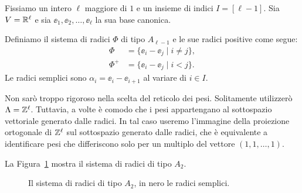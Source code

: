 \begin{example}
    \label{ex:sist_rad_A}
    Fissiamo un intero $\ell$ maggiore di $1$ e un insieme di indici $I = [\ell-1]$.
    Sia $V = \mathbb{R}^\ell$ e sia $\ee_1, \ee_2, \dots, \ee_\ell$ la sua base canonica.

    Definiamo il sistema di radici $\Phi$ di tipo $A_{\ell-1}$ e le 
    sue radici positive come segue:
    \begin{align*}
        \Phi &= \{ \ee_i - \ee_j \mid i \neq j\}, \\
        \Phi^+ &= \{ \ee_i - \ee_j \mid i < j\}.
    \end{align*}
    Le radici semplici sono $\alpha_i = \ee_i - \ee_{i+1}$ al variare di $i \in I$.

    Non sar\`o troppo rigoroso nella scelta del reticolo dei pesi.
    Solitamente utilizzer\`o $\Lambda = \mathbb{Z}^\ell$.
    Tuttavia, a volte \`e comodo che
    i pesi appartengano al sottospazio vettoriale generato dalle radici.
    In tal caso useremo l'immagine della proiezione ortogonale di $\mathbb{Z}^\ell$ 
    sul sottospazio generato dalle radici, che \`e equivalente a identificare
    pesi che differiscono solo per un multiplo del vettore $(1, 1, \dots, 1)$.


    La Figura~\ref{fig:ex_sist_rad_A2} mostra il sistema di radici di tipo $A_2$.

    \begin{figure}[htbp]
        \centering
        \caption{Il sistema di radici di tipo $A_2$, in nero le radici semplici.}
        \label{fig:ex_sist_rad_A2}
    \end{figure}
\end{example}



